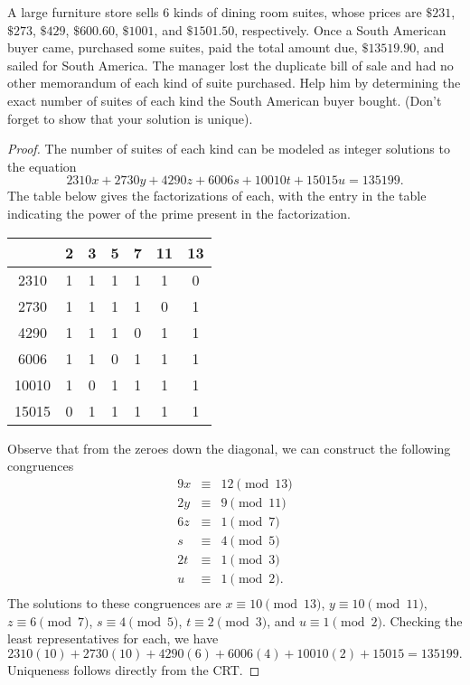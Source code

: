 \documentclass[10pt]{amsart}
\begin{document}
\begin{thm}\label{ex6}
  A large furniture store sells 6 kinds of dining room suites, whose prices are $\$231$, $\$273$, $\$429$, $\$600.60$, $\$1001$, and $\$1501.50$, respectively.
  Once a South American buyer came, purchased some suites, paid the total amount due, $\$13519.90$, and sailed for South America.
  The manager lost the duplicate bill of sale and had no other memorandum of each kind of suite purchased.
  Help him by determining the exact number of suites of each kind the South American buyer bought.
  (Don't forget to show that your solution is unique).

  \begin{proof}
    The number of suites of each kind can be modeled as integer solutions to the equation
    $$2310x + 2730y + 4290z + 6006s + 10010t + 15015u = 135199.$$
    The table below gives the factorizations of each, with the entry in the table indicating the power of the prime present in the factorization.
    \begin{center}
      \begin{tabular}{|c|c|c|c|c|c|c|}
        \hline
        & 2 & 3 & 5 & 7 & 11 & 13\\
        \hline
        2310 & 1 & 1 & 1 & 1 & 1 & 0\\
        \hline
        2730 & 1 & 1 & 1 & 1 & 0 & 1\\
        \hline
        4290 & 1 & 1 & 1 & 0 & 1 & 1\\
        \hline
        6006 & 1 & 1 & 0 & 1 & 1 & 1\\
        \hline
        10010 & 1 & 0 & 1 & 1 & 1 & 1\\
        \hline
        15015 & 0 & 1 & 1 & 1 & 1 & 1\\
        \hline
      \end{tabular}
    \end{center}
    Observe that from the zeroes down the diagonal, we can construct the following congruences
    \begin{eqnarray*}    
      9x &\equiv& 12 \pmod{13}\\
      2y &\equiv& 9 \pmod{11}\\
      6z &\equiv& 1 \pmod{7}\\
      s &\equiv& 4 \pmod{5}\\
      2t &\equiv& 1 \pmod{3}\\
      u &\equiv& 1 \pmod{2}.\\
    \end{eqnarray*}
    The solutions to these congruences are $x \equiv 10 \pmod{13}$, $y \equiv 10 \pmod{11}$, $z \equiv 6 \pmod{7}$, $s \equiv 4 \pmod{5}$, $t \equiv 2 \pmod{3}$, and $u \equiv 1 \pmod{2}$.
    Checking the least representatives for each, we have
    $$2310(10) + 2730(10) + 4290(6) + 6006(4) + 10010(2) + 15015 = 135199.$$
    Uniqueness follows directly from the CRT.
  \end{proof}
\end{thm}
\end{document}

